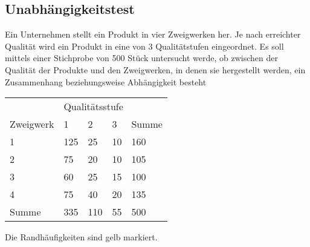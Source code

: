\subsection{Unabhängigkeitstest}
Ein Unternehmen stellt ein Produkt in vier Zweigwerken her. Je nach erreichter Qualität wird ein Produkt in eine von 3 Qualitätstufen eingeordnet. Es soll mittels einer Stichprobe von 500 Stück untersucht werde, ob zwischen der Qualität der Produkte und den Zweigwerken, in denen sie hergestellt werden, ein Zusammenhang beziehungsweise Abhängigkeit besteht\\
\begin{table}[htb]
\centering
\begin{tabular}{@{}lllll@{}} \toprule
 & \multicolumn{4}{l}{Qualitätsstufe} \\
\multirow{-2}{*}{Zweigwerk} & 1 & 2 & 3 & Summe \\ \midrule
1 & 125 & 25 & 10 & \cellcolor[HTML]{FFFC9E}160 \\
2 & 75 & 20 & 10 & \cellcolor[HTML]{FFFC9E}105 \\
3 & 60 & 25 & 15 & \cellcolor[HTML]{FFFC9E}100 \\
4 & 75 & 40 & 20 & \cellcolor[HTML]{FFFC9E}135 \\
Summe & \cellcolor[HTML]{FFFC9E}335 & \cellcolor[HTML]{FFFC9E}110 & \cellcolor[HTML]{FFFC9E}55 & \cellcolor[HTML]{FFFC9E}500 \\ \bottomrule
\end{tabular}
\end{table}
Die Randhäufigkeiten sind gelb markiert. 
